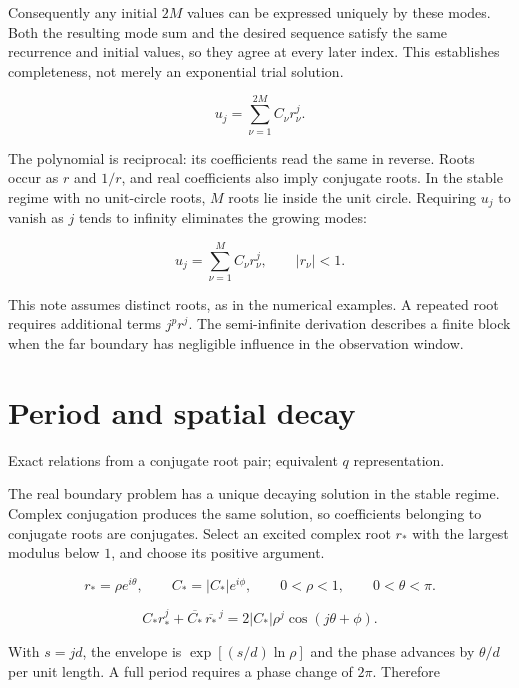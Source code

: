 \documentclass[10pt,a4paper]{article}
\newcommand{\subtitle}[1]{%
  {\small\color{muted}#1\par}\medskip}
\newcommand{\smallnote}[1]{%
  {\small #1\par}}
\begin{document}
Consequently any initial $2M$ values can be expressed
uniquely by these modes.
Both the resulting mode sum and the desired sequence
satisfy the same recurrence and initial values,
so they agree at every later index.
This establishes completeness, not merely an
exponential trial solution.

\begin{equation}
u_j=\sum_{\nu=1}^{2M}C_\nu r_\nu^j.
\end{equation}

The polynomial is reciprocal:
its coefficients read the same in reverse.
Roots occur as $r$ and $1/r$, and real coefficients
also imply conjugate roots.
In the stable regime with no unit-circle roots,
$M$ roots lie inside the unit circle.
Requiring $u_j$ to vanish as $j$ tends to infinity
eliminates the growing modes:

\begin{equation}
u_j=\sum_{\nu=1}^{M}C_\nu r_\nu^j,
\qquad |r_\nu|<1.
\end{equation}

\smallnote{
This note assumes distinct roots, as in the numerical
examples.
A repeated root requires additional terms $j^p r^j$.
The semi-infinite derivation describes a finite block
when the far boundary has negligible influence
in the observation window.
}

\clearpage
\section{Period and spatial decay}
\subtitle{Exact relations from a conjugate root pair;
equivalent $q$ representation.}

The real boundary problem has a unique decaying solution
in the stable regime.
Complex conjugation produces the same solution,
so coefficients belonging to conjugate roots
are conjugates.
Select an excited complex root $r_*$ with the largest
modulus below $1$, and choose its positive argument.

\begin{equation}
r_*=\rho e^{i\theta},
\qquad
C_*=|C_*|e^{i\phi},
\qquad
0<\rho<1,
\qquad
0<\theta<\pi.
\end{equation}

\begin{equation}
C_*r_*^j
+
\overline{C_*}\,\overline{r_*}^{\,j}
=
2|C_*|\rho^j\cos(j\theta+\phi).
\end{equation}

With $s=jd$, the envelope is
$\exp[(s/d)\ln\rho]$ and the phase advances by
$\theta/d$ per unit length.
A full period requires a phase change of $2\pi$.
Therefore
\end{document}

